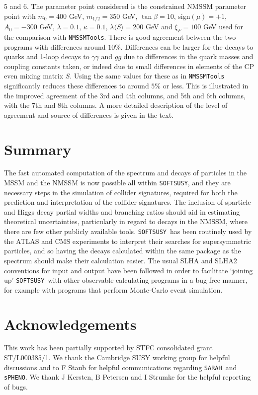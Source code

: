 \documentclass[final,3p,times]{elsarticle}
\def\code#1{{\tt #1}}
\begin{document}
\begin{center}
\begin{table}
{  5 and 6. The 
  parameter point considered is the
constrained NMSSM
  parameter point  with $m_0 =
  400$ GeV, $m_{1/2} = 350$ GeV, 
  $\tan\beta = 10$, sign$(\mu) = +1$, $A_0 = -300$ GeV, $\lambda = 0.1$,
  $\kappa = 
  0.1$, $\lambda \langle S \rangle = 200$ GeV and $\xi_F = 100$ GeV
used for the comparison with {\tt NMSSMTools}.
There is good agreement between the two
  programs with differences around $10\%$. Differences can be larger for the
  decays to quarks and 1-loop decays to $\gamma \gamma$ and $gg$ due to
  differences in the quark masses and coupling constants taken, or indeed due to small
  differences in elements of the CP even mixing matrix $S$. Using the same
  values for these as in {\tt NMSSMTools} significantly reduces these
  differences to around $5\%$ or less. This is illustrated in the improved
  agreement of the 3rd 
  and 4th columns, and 5th and 6th columns, with the 7th and 8th columns. A
  more detailed description of 
  the level of agreement and source of differences is given in the text.} 
\label{nmssmSLHAnoZ3Inputspctable}
\end{table}
\end{center}
       



\section{Summary} \label{sec:sum}
The fast automated computation of the spectrum and decays of particles in the
MSSM and the NMSSM is now possible all within \code{SOFTSUSY}, and they are
necessary steps in the simulation of collider signatures, required for both
the prediction and interpretation of the collider signatures. The inclusion
of sparticle and Higgs decay partial widths and branching ratios should aid in
estimating 
theoretical uncertainties, particularly in regard to decays in the NMSSM,
where there are few other publicly available tools. 
\code{SOFTSUSY}~has been routinely used by the ATLAS and CMS experiments to
interpret their searches for supersymmetric particles, and so having the
decays calculated within the same package as the spectrum should make their
calculation easier. 
The usual SLHA and SLHA2
conventions for input and output have been followed in order to facilitate
`joining up' \code{SOFTSUSY}~with other observable calculating programs in a
bug-free manner, for example with programs that perform Monte-Carlo event
simulation. 

\section*{Acknowledgements}
This work has been partially supported by STFC consolidated grant 
ST/L000385/1. We thank the Cambridge SUSY working group for helpful
discussions and to F Staub for helpful communications regarding
\code{SARAH}~and \code{sPHENO}. We thank J Kersten, B Petersen 
and I Strumke for the helpful reporting
of bugs. 
\end{document}
